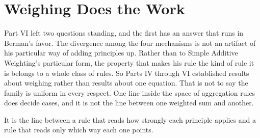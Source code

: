 \section{Weighing Does the Work}

Part VI left two questions standing, and the first has an answer that runs
in Berman's favor. The divergence among the four mechanisms is not an
artifact of his particular way of adding principles up. Rather than to Simple Additive Weighting's particular form, the property
that makes his rule the kind of rule it is belongs to a whole class of
rules. So Parts IV through VI established results about weighing
rather than results about one equation. That is
not to say the family is uniform in every respect. One line inside the
space of aggregation rules does decide cases, and it is not the line
between one weighted sum and another.

It is the line between a rule that
reads how strongly each principle applies and a rule that reads only
which way each one points.

